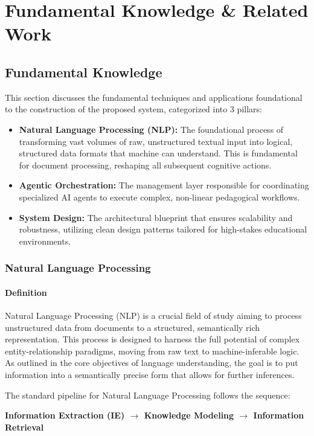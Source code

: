\chapter{Fundamental Knowledge \& Related Work}
\section{Fundamental Knowledge}
This section discusses the fundamental techniques and applications foundational to the construction of the proposed system, categorized into 3 pillars: 
\begin{itemize}
    \item \textbf{Natural Language Processing (NLP):} The foundational process of transforming vast volumes of raw, unstructured textual input into logical, structured data formats that machine can understand. This is fundamental for document processing, reshaping all subsequent cognitive actions.
    \item \textbf{Agentic Orchestration:} The management layer responsible for coordinating specialized AI agents to execute complex, non-linear pedagogical workflows.
    \item \textbf{System Design:} The architectural blueprint that ensures scalability and robustness, utilizing clean design patterns tailored for high-stakes educational environments.
\end{itemize}
\subsection{Natural Language Processing}

\subsubsection{Definition}
Natural Language Processing (NLP) is a crucial field of study aiming to process unstructured data from documents to a structured, semantically rich representation. This process is designed to harness the full potential of complex entity-relationship paradigms, moving from raw text to machine-inferable logic. As outlined in the core objectives of language understanding, the goal is to put information into a semantically precise form that allows for further inferences.

The standard pipeline for Natural Language Processing follows the sequence:
\begin{center}
    \textbf{Information Extraction (IE) $\longrightarrow$ Knowledge Modeling $\longrightarrow$ Information Retrieval}
\end{center}

